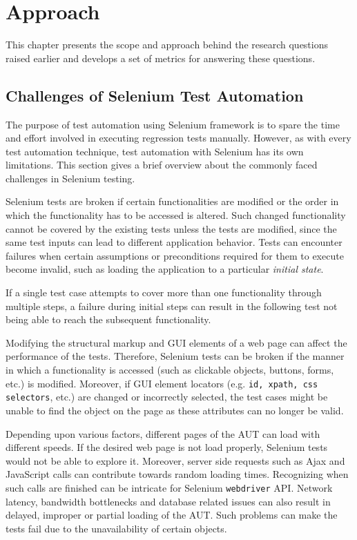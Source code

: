 \chapter{Approach} %
\label{Chapter3} %


This chapter presents the scope and approach behind the research questions raised earlier and develops a set of metrics for answering these questions.

\section{Challenges of Selenium Test Automation}
\label{challengesSelenium}
The purpose of test automation using Selenium framework is to spare the time and effort involved in executing regression tests manually. However, as with every test automation technique, test automation with Selenium has its own limitations. This section gives a brief overview about the commonly faced challenges in Selenium testing.

Selenium tests are broken if certain functionalities are modified or the order in which the functionality has to be accessed is altered. Such changed functionality cannot be covered by the existing tests unless the tests are modified, since the same test inputs can lead to different application behavior. Tests can encounter failures when certain assumptions or preconditions required for them to execute become invalid, such as loading the application to a particular \textit{initial state}.

If a single test case attempts to cover more than one functionality through multiple steps, a failure during initial steps can result in the following test not being able to reach the subsequent functionality.

Modifying the structural markup and GUI elements of a web page can affect the performance of the tests. Therefore, Selenium tests can be broken if the manner in which a functionality is accessed (such as clickable objects, buttons, forms, etc.) is modified. Moreover, if GUI element locators (e.g. \texttt{id, xpath, css selectors}, etc.) are changed or incorrectly selected, the test cases might be unable to find the object on the page as these attributes can no longer be valid.

Depending upon various factors, different pages of the AUT can load with different speeds. If the desired web page is not load properly, Selenium tests would not be able to explore it. Moreover, server side requests such as Ajax and JavaScript calls can contribute towards random loading times. Recognizing when such calls are finished can be intricate for Selenium \texttt{webdriver} API. Network latency, bandwidth bottlenecks and database related issues can also result in delayed, improper or partial loading of the AUT. Such problems can make the tests fail due to the unavailability of certain objects.

